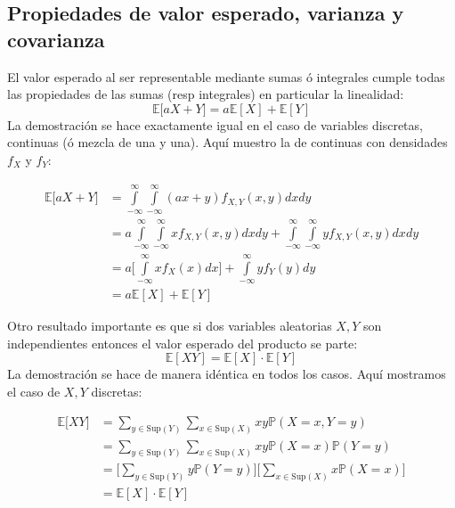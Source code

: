 \documentclass[
]{book}
\begin{document}
\hypertarget{propiedades-de-valor-esperado-varianza-y-covarianza}{%
\subsection{Propiedades de valor esperado, varianza y covarianza}\label{propiedades-de-valor-esperado-varianza-y-covarianza}}

El valor esperado al ser representable mediante sumas ó integrales cumple todas las propiedades de las sumas (resp integrales) en particular la linealidad:
\[
\mathbb{E}\Big[ a X + Y\Big] = a \mathbb{E}[X] + \mathbb{E}[Y]
\]
La demostración se hace exactamente igual en el caso de variables discretas, continuas (ó mezcla de una y una). Aquí muestro la de continuas con densidades \(f_X\) y \(f_Y\):

\begin{equation}
\begin{aligned}
\mathbb{E}\Big[ a X + Y\Big] & = \int\limits_{-\infty}^{\infty} \int\limits_{-\infty}^{\infty} (a x + y) f_{X,Y}(x,y) dx dy \\
& = a \int\limits_{-\infty}^{\infty} \int\limits_{-\infty}^{\infty} x  f_{X,Y}(x,y)  dx dy +  \int\limits_{-\infty}^{\infty} \int\limits_{-\infty}^{\infty} y f_{X,Y}(x,y)  dx dy \\
& = a \Big[ \int\limits_{-\infty}^{\infty} x  f_X(x) dx \Big] +  \int\limits_{-\infty}^{\infty} y f_Y(y) dy \\
& =  a \mathbb{E}[X] + \mathbb{E}[Y]
\end{aligned}
\end{equation}

Otro resultado importante es que si dos variables aleatorias \(X,Y\) son independientes entonces el valor esperado del producto se parte:
\[
\mathbb{E}[XY] = \mathbb{E}[X] \cdot \mathbb{E}[Y]
\]
La demostración se hace de manera idéntica en todos los casos. Aquí mostramos el caso de \(X,Y\) discretas:

\begin{equation}
\begin{aligned}
\mathbb{E}\Big[XY\Big] & = \sum\limits_{y \in \text{Sup}(Y)} \sum\limits_{x \in \text{Sup}(X)} xy \mathbb{P}(X = x, Y = y) 
\\ & = \sum\limits_{y \in \text{Sup}(Y)} \sum\limits_{x \in \text{Sup}(X)} xy \mathbb{P}(X = x) \mathbb{P}(Y = y) 
\\ & = \Big[\sum\limits_{y \in \text{Sup}(Y)} y  \mathbb{P}(Y = y)\Big]  \Big[\sum\limits_{x \in \text{Sup}(X)} x \mathbb{P}(X = x)\Big]
\\ & = \mathbb{E}[X] \cdot \mathbb{E}[Y]
\end{aligned}
\end{equation}
\end{document}
